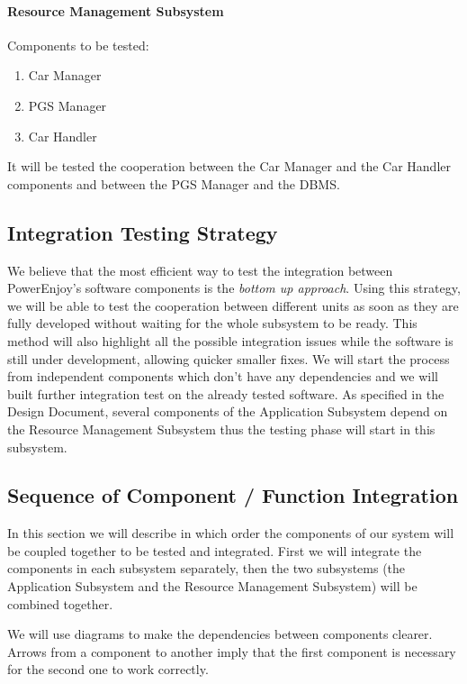 \documentclass[english]{article}
\begin{document}
\paragraph{Resource Management Subsystem}
Components to be tested:
\begin{enumerate}
\item Car Manager
\item PGS Manager
\item Car Handler
\end{enumerate}

It will be tested the cooperation between the Car Manager and the Car Handler components and between the PGS Manager and the DBMS.



\subsection{Integration Testing Strategy}
We believe that the most efficient way to test the integration between PowerEnjoy's software components is the \emph{bottom up approach}. Using this strategy, we will be able to test the cooperation between different units as soon as they are fully developed without waiting for the whole subsystem to be ready. This method will also highlight all the possible integration issues while the software is still under development, allowing quicker smaller fixes.
We will start the process from independent components which don't have any dependencies and we will built further integration test on the already  tested software.
As specified in the Design Document, several components of the Application Subsystem depend on the Resource Management Subsystem thus the testing phase will start in this subsystem.


\subsection{Sequence of Component / Function Integration}
\label{subsec:sequence}
In this section we will describe in which order the components of our system will be coupled together to be tested and integrated.
First we will integrate the components in each subsystem separately, then the two subsystems (the Application Subsystem and the Resource Management Subsystem) will be combined together.

We will use diagrams to make the dependencies between components clearer. Arrows from a component to another imply that the first component is necessary for the second one to work correctly.
\end{document}
